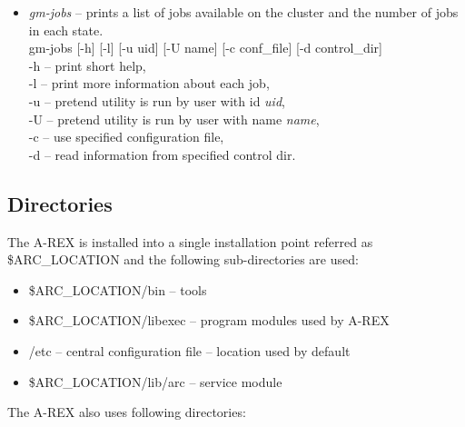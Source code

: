 \documentclass{article}                            %
\begin{document}
\begin{itemize}
\item \textit{gm-jobs} -- prints a list of jobs available on the cluster
and the number of jobs in each state.\\
\hspace*{0.5cm}gm-jobs {[}-h] {[}-l] {[}-u uid] {[}-U name] {[}-c conf\_file] {[}-d control\_dir]\\
\hspace*{0.5cm}-h -- print short help,\\
\hspace*{0.5cm}-l -- print more information about each job,\\
\hspace*{0.5cm}-u -- pretend utility is run by user with id \emph{uid},\\
\hspace*{0.5cm}-U -- pretend utility is run by user with name \emph{name},\\
\hspace*{0.5cm}-c -- use specified configuration file,\\
\hspace*{0.5cm}-d -- read information from specified control dir.
\end{itemize}


\subsection{Directories}

The A-REX is installed into a single installation point referred as
\$ARC\_LOCATION and the following sub-directories are used:

\begin{itemize}
\item[] \$ARC\_LOCATION/bin -- tools
\item[] \$ARC\_LOCATION/libexec -- program modules used by A-REX
\item[] /etc -- central configuration file -- location used by default
\item[] \$ARC\_LOCATION/lib/arc -- service module
\end{itemize}

The A-REX also uses following directories:
\end{document}

